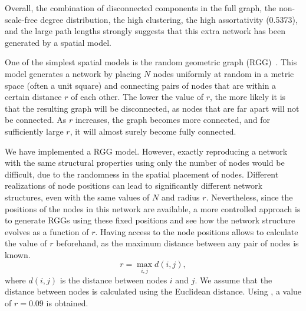 \documentclass{article}
\begin{document}
Overall, the combination of disconnected components in the full graph, the non-scale-free degree distribution, the high clustering, the high assortativity (0.5373), and the large path lengths strongly suggests that this extra network has been generated by a spatial model.

One of the simplest spatial models is the random geometric graph (RGG)~\cite{penrose2003random}. This model generates a network by placing $N$ nodes uniformly at random in a metric space (often a unit square) and connecting pairs of nodes that are within a certain distance $r$ of each other. The lower the value of $r$, the more likely it is that the resulting graph will be disconnected, as nodes that are far apart will not be connected. As $r$ increases, the graph becomes more connected, and for sufficiently large $r$, it will almost surely become fully connected.

We have implemented a RGG model. However, exactly reproducing a network with the same structural properties using only the number of nodes would be difficult, due to the randomness in the spatial placement of nodes. Different realizations of node positions can lead to significantly different network structures, even with the same values of $N$ and radius $r$. Nevertheless, since the positions of the nodes in this network are available, a more controlled approach is to generate RGGs using these fixed positions and see how the network structure evolves as a function of $r$. Having access to the node positions allows to calculate the value of $r$ beforehand, as the maximum distance between any pair of nodes is known.
\begin{equation}\label{eq:radius}
    r = \max_{i,j} d(i,j),
\end{equation}
where $d(i,j)$ is the distance between nodes $i$ and $j$. We assume that the distance between nodes is calculated using the Euclidean distance. Using , a value of $r=0.09$ is obtained.
\end{document}
